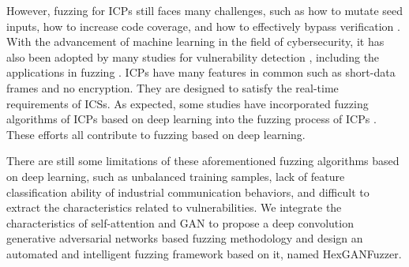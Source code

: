 However, fuzzing for ICPs still faces many challenges, such as how to mutate seed inputs, how to increase code coverage, and how to effectively bypass verification \cite{li2018fuzzing}.
With the advancement of machine learning in the field of cybersecurity, it has also been adopted by many studies for vulnerability detection %
\cite{wu2017vulnerability} \cite{xia2018remote} , including the applications in fuzzing \cite{godefroid2017learn} %
\cite{chen2018systematic}. ICPs have many features in common such as short-data frames and no encryption. They are designed to satisfy the real-time requirements of ICSs. As expected, some studies have incorporated fuzzing algorithms of ICPs based on deep learning into the fuzzing process of ICPs \cite{li2019intelligent}. %
 These efforts all contribute to fuzzing based on deep learning.

There are still some limitations of these aforementioned fuzzing algorithms based on deep learning, such as unbalanced training samples, lack of feature classification ability of industrial communication behaviors, and difficult to extract the characteristics related to vulnerabilities. We integrate the characteristics of self-attention and GAN to propose a deep convolution generative adversarial networks based fuzzing methodology and design an automated and intelligent fuzzing framework based on it, named HexGANFuzzer. %


